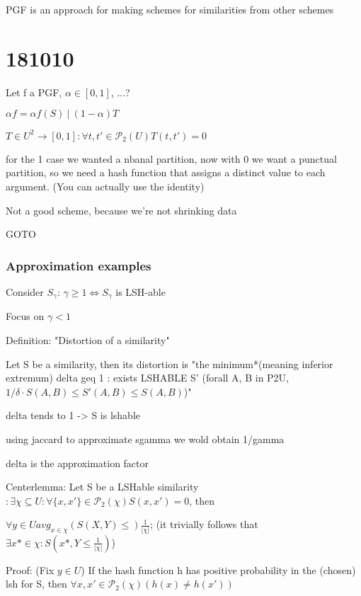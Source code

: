 \documentclass{report}
\begin{document}
	
	
	PGF is an approach for making schemes for similarities from other schemes
	
	\section{181010}
	
	Let f a PGF, $\alpha \in [0, 1]$, ...?
	
	$\alpha f = \alpha f(S)\ |\ (1 - \alpha)T$
	
	$T \in U^2 \to [0, 1] : \forall {t, t'} \in \mathcal{P}_2(U) T(t, t') = 0$
	
	for the 1 case we wanted a nbanal partition, now with 0 we want a punctual partition, so we need a hash function that assigns a distinct value to each argument. (You can actually use the identity)
	
	Not a good scheme, because we're not shrinking data
	
	GOTO %
	
	\subsubsection{Approximation examples}
	
	Consider $S_\gamma$: $\gamma \geq 1 \Leftrightarrow S_\gamma$ is LSH-able
	
	Focus on $\gamma < 1$
	
	Definition: "Distortion of a similarity"
	
	Let S be a similarity, then its distortion is "the minimum*(meaning inferior extremum) delta geq 1 : exists LSHABLE S' (forall {A, B} in P2U, $1/\delta \cdot S(A, B) \leq S'(A, B) \leq S(A, B)$)"
	
	delta tends to 1 -> S is lshable
	
	using jaccard to approximate sgamma we wold obtain 1/gamma
	
	delta is the approximation factor
	
	
	Centerlemma: Let S be a LSHable similarity $ : \exists \chi \subseteq U : \forall \{x, x'\} \in \mathcal{P}_2(\chi) S(x, x')=0$, then
	
	$\forall y \in U avg_{x \in \chi}(S(X, Y) \leq) \frac{1}{|\chi|}$; (it trivially follows that $\exists x* \in \chi : S(x*, Y \leq \frac{1}{|\chi|})$)
	
	Proof: (Fix $y \in U$) If the hash function h has positive probability in the (chosen) lsh for S, then $\forall {x, x'} \in \mathcal{P}_2(\chi) (h(x)\neq h(x'))$
	
\end{document}
